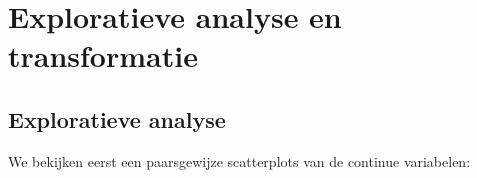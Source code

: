 \documentclass[a4paper, 12pt]{article}
\begin{document}


\section{Exploratieve analyse en transformatie}
\subsection*{Exploratieve analyse}
We bekijken eerst een paarsgewijze scatterplots van de continue variabelen:



\clearpage
\appendix

% 
\end{document}
